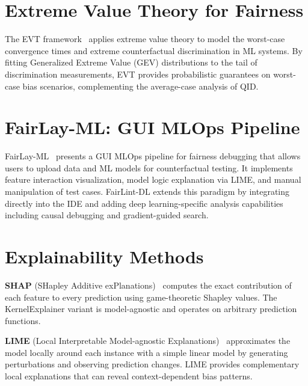 \section{Extreme Value Theory for Fairness}

The EVT framework~\cite{evt_cain} applies extreme value theory to model the worst-case convergence times and extreme counterfactual discrimination in ML systems. By fitting Generalized Extreme Value (GEV) distributions to the tail of discrimination measurements, EVT provides probabilistic guarantees on worst-case bias scenarios, complementing the average-case analysis of QID.

\section{FairLay-ML: GUI MLOps Pipeline}

FairLay-ML~\cite{fairlayml} presents a GUI MLOps pipeline for fairness debugging that allows users to upload data and ML models for counterfactual testing. It implements feature interaction visualization, model logic explanation via LIME, and manual manipulation of test cases. FairLint-DL extends this paradigm by integrating directly into the IDE and adding deep learning-specific analysis capabilities including causal debugging and gradient-guided search.

\section{Explainability Methods}

\textbf{SHAP} (SHapley Additive exPlanations)~\cite{lundberg2017, kamolov2025} computes the exact contribution of each feature to every prediction using game-theoretic Shapley values. The KernelExplainer variant is model-agnostic and operates on arbitrary prediction functions.

\textbf{LIME} (Local Interpretable Model-agnostic Explanations)~\cite{ribeiro2016, wang2024} approximates the model locally around each instance with a simple linear model by generating perturbations and observing prediction changes. LIME provides complementary local explanations that can reveal context-dependent bias patterns.
